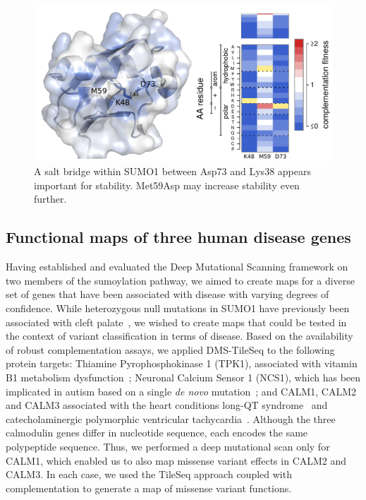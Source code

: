 \begin{figure}[h!]
	\centering
	\includegraphics[width=\textwidth]{img/saltbridge.pdf}
	\caption{A salt bridge within SUMO1 between Asp73 and Lys38 appears important for stability. Met59Asp may increase stability even further.}
	\label{fig:saltbridge}
\end{figure}






\subsection{Functional maps of three human disease genes}

Having established and evaluated the Deep Mutational Scanning framework on two members of the sumoylation pathway, we aimed to create maps for a diverse set of genes that have been associated with disease with varying degrees of confidence. While  heterozygous null mutations in SUMO1 have previously been associated with cleft palate~\cite{andreou_tbx22_2007}, we wished to create maps that could be tested in the context of variant classification in terms of disease. Based on the availability of robust complementation assays, we applied DMS-TileSeq to the following protein targets: Thiamine Pyrophosphokinase 1 (TPK1), associated with vitamin B1 metabolism dysfunction~\cite{mayr_thiamine_2011}; Neuronal Calcium Sensor 1 (NCS1), which has been implicated in autism based on a single \textit{de novo} mutation~\cite{handley_structural_2010};  and CALM1, CALM2 and CALM3 associated with the heart conditions long-QT syndrome~\cite{crotti_calmodulin_2013} and catecholaminergic polymorphic ventricular tachycardia~\cite{nyegaard_mutations_2012}. Although the three calmodulin genes differ in nucleotide sequence, each encodes the same polypeptide sequence. Thus, we performed a deep mutational scan only for CALM1, which enabled us to also map missense variant effects in CALM2 and CALM3. In each case, we used the TileSeq approach coupled with complementation to generate a map of missense variant functions. 


